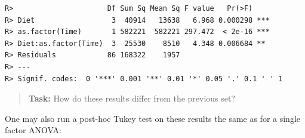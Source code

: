 \documentclass[english,10pt,a4paper,oneside]{book}
\newenvironment{Shaded}{\begin{snugshade}}{\end{snugshade}}
\newcommand{\KeywordTok}[1]{\textcolor[rgb]{0.13,0.29,0.53}{\textbf{#1}}}
\newcommand{\DataTypeTok}[1]{\textcolor[rgb]{0.13,0.29,0.53}{#1}}
\newcommand{\DecValTok}[1]{\textcolor[rgb]{0.00,0.00,0.81}{#1}}
\newcommand{\StringTok}[1]{\textcolor[rgb]{0.31,0.60,0.02}{#1}}
\newcommand{\OperatorTok}[1]{\textcolor[rgb]{0.81,0.36,0.00}{\textbf{#1}}}
\newcommand{\NormalTok}[1]{#1}
\theoremstyle{definition}
\theoremstyle{definition}
\theoremstyle{definition}
\theoremstyle{remark}
\begin{document}
\begin{Shaded}
\end{Shaded}

\begin{verbatim}
R>                      Df Sum Sq Mean Sq F value   Pr(>F)    
R> Diet                  3  40914   13638   6.968 0.000298 ***
R> as.factor(Time)       1 582221  582221 297.472  < 2e-16 ***
R> Diet:as.factor(Time)  3  25530    8510   4.348 0.006684 ** 
R> Residuals            86 168322    1957                     
R> ---
R> Signif. codes:  0 '***' 0.001 '**' 0.01 '*' 0.05 '.' 0.1 ' ' 1
\end{verbatim}

\begin{quote}
\textbf{Task:} How do these results differ from the previous set?
\end{quote}

One may also run a post-hoc Tukey test on these results the same as for
a single factor ANOVA:

\begin{Shaded}
\end{Shaded}
\end{document}
